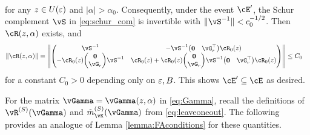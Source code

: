 \begin{proof-of-lemma}
\begin{align}
	\end{align}
for any $z\in U(\varepsilon)$ and $|\alpha|>\alpha_0$. Consequently, under the event
$\cE'$, the Schur complement $\vS$ in \eqref{eq:schur_com} is
invertible with $\|\vS^{-1}\|<c_0^{-1/2}$.
Then $\vcR(z,\alpha)$ exists, and
	\begin{align}
	\|\vcR(z,\alpha)\|
	&=\left\|\begin{pmatrix}
		\vS^{-1}& -\vS^{-1}\begin{pmatrix}
			\mathbf{0}&
			\vG_r^\top
		\end{pmatrix} \vcR_0(z)\\
		-\vcR_0(z)\begin{pmatrix}
			\mathbf{0}\\
			\vG_r
		\end{pmatrix} \vS^{-1} & \vcR_0(z)+\vcR_0(z)\begin{pmatrix}
			\mathbf{0}\\
			\vG_r
		\end{pmatrix}\vS^{-1}\begin{pmatrix}
			\mathbf{0}&
			\vG_r^\top
		\end{pmatrix}\vcR_0(z)
	\end{pmatrix}\right\| \leq C_0
	\end{align}
for a constant $C_0>0$ depending only on $\varepsilon,B$.
This shows $\cE' \subseteq \cE$ as desired.
        \end{proof-of-lemma}

For the matrix $\vGamma=\vGamma(z,\alpha)$ in \eqref{eq:Gamma}, recall the definitions of
$\vR^{(S)}(\vGamma)$ and $\tilde m_{\vK}^{(S)}(\vGamma)$ from
\eqref{eq:leaveoneout}. The following provides an analogue of
Lemma \ref{lemma:FAconditions} for these quantities.

